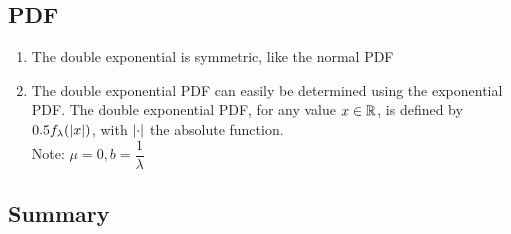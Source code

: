 \subsection{PDF}

\begin{enumerate}
    \item The double exponential is symmetric, like the normal PDF
    \hfill \cite{statistics/book/Statistics-for-Data-Scientists/Maurits-Kaptein}

    \item The double exponential PDF can easily be determined using the exponential PDF. 
    The double exponential PDF, for any value $x \in \mathbb{R}$, is defined by $0.5 f_\lambda (\left| x \right|)$, with $\left| \cdot \right|$ the absolute function.
    \hfill \cite{statistics/book/Statistics-for-Data-Scientists/Maurits-Kaptein}
    \\
    Note: $\mu = 0, b=\dfrac{1}{\lambda}$
    \hfill \cite{common/online/chatgpt}
\end{enumerate}




\subsection{Summary}

